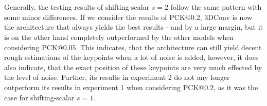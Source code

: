 \documentclass[./main.tex]{subfiles}
\begin{document}
\\
\\
Generally, the testing results of shifting-scalar $s = 2$ follow the same pattern with some minor differences. If we consider the results of PCK$@0.2$, 3DConv is now the architecture that always yields the best results - and by a large margin, but it is on the other hand completely outperformed by the other models when considering PCK$@0.05$. This indicates, that the architecture can still yield decent rough estimations of the keypoints when a lot of noise is added, however, it does also indicate, that the exact position of these keypoints are very much effected by the level of noise. Further, its results in experiment 2 do not any longer outperform its results in experiment 1 when considering PCK$@0.2$, as it was the case for shifting-scalar $s = 1$.
\end{document}
